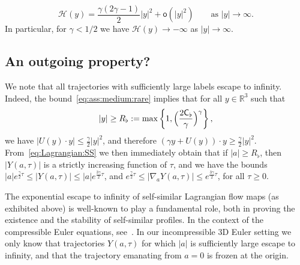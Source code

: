 \documentclass[11pt,reqno]{amsproc}
\numberwithin{equation}{section}
\theoremstyle{remark}
\newcommand{\fr}{\frac}
\begin{document}
{\begin{equation}
\label{eq:Bernoulli:far:field}
\mathcal{H}(y) = \frac{\gamma(2\gamma-1)}{2} |y|^2 + \mathsf{o}(|y|^2)
\qquad \mbox{as } |y|\to\infty.
\end{equation}
In particular, for $\gamma < 1/2$ we have $\mathcal{H}(y) \to -\infty$ as $|y|\to \infty$.
}

\subsection{An outgoing property?}
\label{sec:outgoing?}
We note that all trajectories with sufficiently large labels escape to infinity. Indeed, the bound~\eqref{eq:ass:medium:rare} implies that for all $y \in \mathbb{R}^3$ such that  
\begin{equation}
\label{eq:R:flat:def}
|y| \geq R_\flat:= \max\left\{ 1, \Bigl(\frac{2\mathsf{C}_\flat}{\gamma}\Bigr)^\gamma \right\},
\end{equation}
we have $|U(y) \cdot y| \leq \fr{\gamma}{2} |y|^2$, and therefore $(\gamma y + U(y)) \cdot y \geq \frac{\gamma}{2} |y|^2$.   From~\eqref{eq:Lagrangian:SS} we then immediately obtain that if $|a| \geq  R_\flat$, then $|Y(a,\tau)|$ is a strictly increasing function of $\tau$, and we have the bounds
$|a| e^{\frac{\gamma}{2}\tau} 
\leq |Y(a,\tau)| \leq 
|a| e^{\frac{3\gamma}{2}\tau}$, and $
e^{\frac{\gamma}{2}\tau}
\leq |\nabla_a Y(a,\tau)| \leq 
e^{\frac{3\gamma}{2}\tau}$, 
for all $\tau\geq 0$. 

The exponential escape to infinity of self-similar Lagrangian flow maps (as exhibited above) is well-known to play a fundamental role, both in proving the existence and the stability of self-similar profiles. In the context of the compressible Euler equations, see~\cite{BSV23,MRRS22a,BCG25,CCSV24}.
In our incompressible 3D Euler setting we only know that trajectories $Y(a,\tau)$ for which $|a|$ is sufficiently large escape to infinity, and that the trajectory emanating from $a=0$ is frozen at the origin. 
\end{document}
